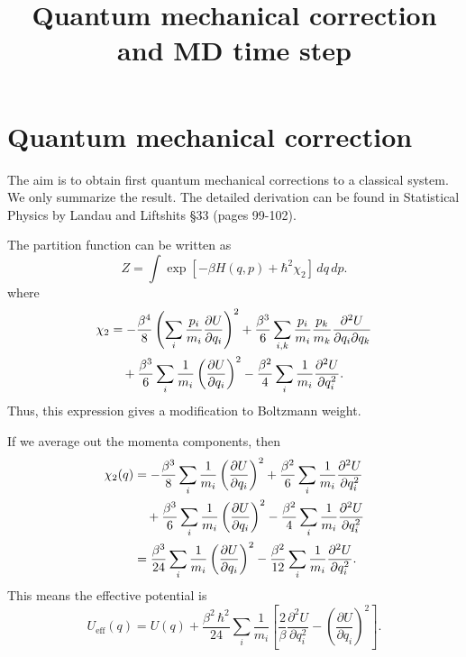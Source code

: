 \documentclass{article}
\begin{document}
\title{Quantum mechanical correction and MD time step}
\author{ \vspace{-10ex} }
\date{ \vspace{-10ex} }
\maketitle


\section{Quantum mechanical correction}


The aim is to obtain first quantum mechanical corrections
to a classical system.
%
We only summarize the result.
%
The detailed derivation can be found in
Statistical Physics by Landau and Liftshits \S 33 (pages 99-102).


The partition function can be written as
\begin{equation}
Z = \int
\exp\left[-\beta H(q, p) + \hbar^2 \chi_2 \right] \, dq \, dp.
\end{equation}
where
\begin{align}
\chi_2
&=
-\frac{ \beta^4 } { 8 }
\left(
  \sum_i \frac{p_i}{m_i} \frac{\partial U}{\partial q_i}
\right)^2
+\frac{ \beta^3 } { 6 }
\sum_{i,k} \frac{p_i}{m_i} \frac{p_k}{m_k}
  \frac{\partial^2 U}{\partial q_i \partial q_k}
  \notag \\
&\quad
+\frac{ \beta^3 }{6}
  \sum_i \frac{1}{m_i}
    \left( \frac{ \partial U } { \partial q_i } \right)^2
-\frac{ \beta^2 }{4}
  \sum_i \frac{1}{m_i}
    \frac{ \partial^2 U } { \partial q_i^2 }.
\end{align}
Thus, this expression gives a modification to Boltzmann weight.

If we average out the momenta components, then
\begin{align}
\chi_2(q)
&=
-\frac{ \beta^3 } { 8 }
  \sum_i \frac{1}{m_i} \left( \frac{\partial U}{\partial q_i} \right)^2
+\frac{ \beta^2 } { 6 }
\sum_{i} \frac{1}{m_i}
  \frac{\partial^2 U}{\partial q_i^2}
  \notag \\
&\quad
+\frac{ \beta^3 }{6}
  \sum_i \frac{1}{m_i}
    \left( \frac{ \partial U } { \partial q_i } \right)^2
-\frac{ \beta^2 }{4}
  \sum_i \frac{1}{m_i}
    \frac{ \partial^2 U } { \partial q_i^2 }
\notag \\
&=
\frac{ \beta^3 }{24}
  \sum_i \frac{1}{m_i}
    \left( \frac{ \partial U } { \partial q_i } \right)^2
-\frac{ \beta^2 }{12}
  \sum_i \frac{1}{m_i}
    \frac{ \partial^2 U } { \partial q_i^2 }.
\end{align}
This means the effective potential is
%
\begin{equation}
U_{\mathrm{eff}}(q)
=
U(q)
+
\frac{ \beta^2 \, \hbar^2 }{24}
\sum_i \frac{1}{m_i}
\left[
    \frac{2}{\beta}
    \frac{ \partial^2 U } { \partial q_i^2 }
-
    \left( \frac{ \partial U } { \partial q_i } \right)^2
\right].
\label{eq:Ueff}
\end{equation}
\end{document}
